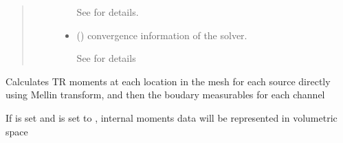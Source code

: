 \documentclass[letterpaper,10pt,english]{sphinxmanual}
\begin{document}
\begin{fulllineitems}
\begin{fulllineitems}
\begin{quote}
\begin{description}
\begin{itemize}
\sphinxAtStartPar
See {\hyperref[\detokenize{_autosummary/nirfasterff.base.data.FDdata:nirfasterff.base.data.FDdata}]{}} for details.

\item {} 
\sphinxAtStartPar
{} () \textendash{} convergence information of the solver.

\sphinxAtStartPar
See {\hyperref[\detokenize{_autosummary/nirfasterff.utils.ConvergenceInfo:nirfasterff.utils.ConvergenceInfo}]{}} for details

\end{itemize}


\end{description}\end{quote}

\end{fulllineitems}


\begin{fulllineitems}
\label{\detokenize{_autosummary/nirfasterff.base.stnd_mesh.stndmesh:nirfasterff.base.stnd_mesh.stndmesh.femdata_moments}}
\pysigstartsignatures
{}
\pysigstopsignatures
\sphinxAtStartPar
Calculates TR moments at each location in the mesh for each source directly using Mellin transform, and then the boudary measurables for each channel

\sphinxAtStartPar
If  is set and  is set to , internal moments data will be represented in volumetric space


\end{fulllineitems}
\end{fulllineitems}
\end{document}
